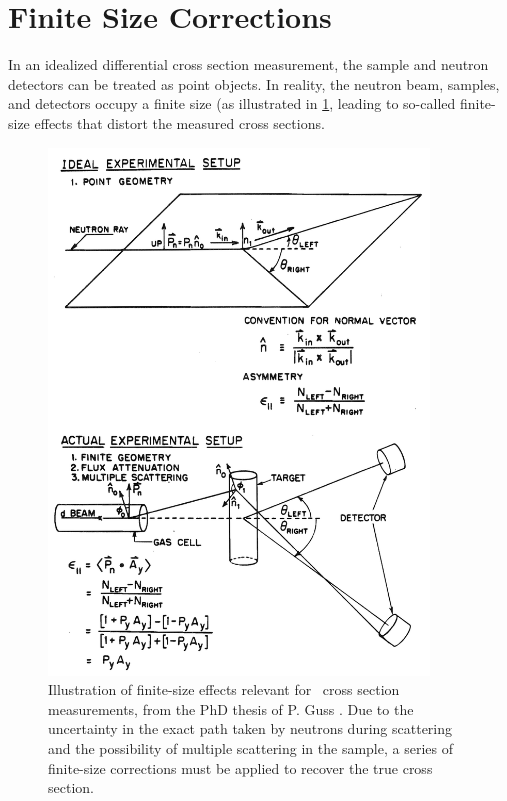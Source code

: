 \section{Finite Size Corrections}
In an idealized differential cross section measurement, the sample and neutron
detectors can be treated as point objects. In reality, the neutron beam,
samples, and detectors occupy a finite size (as illustrated in \ref{GussFiniteSizeDiagram},
leading to so-called finite-size effects that distort the measured cross sections.
\begin{figure}[ht!]
    \centering
        \includegraphics[width = 0.9\textwidth]{figures/GussFiniteSizeDiagram.png}
        \caption[Illustration of finite-size effects relevant for \el\ cross
        section measurements]
        {
            Illustration of finite-size effects relevant for \el\ cross
            section measurements, from the PhD thesis of P. Guss
            \cite{GussPhDThesis}. Due to the uncertainty in the exact path taken
            by neutrons during scattering and the possibility of multiple
            scattering in the sample, a series of finite-size corrections
            must be applied to recover the true cross section.
        }
        \label{GussFiniteSizeDiagram}
\end{figure}
